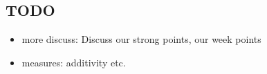 \subsection{TODO} %
\label{sub:TODO}

\begin{itemize}
  \item more discuss: Discuss our strong points, our week points
  \item measures: additivity etc.
\end{itemize}

